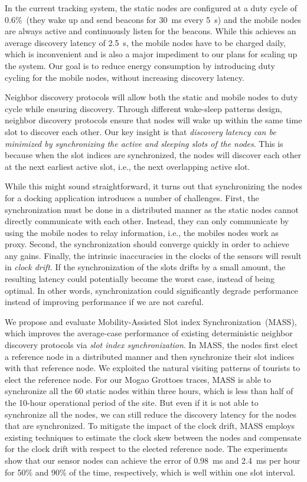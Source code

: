 \documentclass[twoside,twocolumn]{article}
\begin{document}
In the current tracking system, the static nodes are configured at a duty cycle of 0.6\%~(they wake up and send beacons
for 30~ms every 5~s) and the mobile nodes are always active and continuously listen for the beacons. While this achieves
an average discovery latency of 2.5~s, the mobile nodes have to be charged daily, which is inconvenient and is also a
major impediment to our plans for scaling up the system. Our goal is to reduce energy consumption by introducing duty
cycling for the mobile nodes, without increasing discovery latency.

Neighbor discovery protocols will allow both the static and mobile nodes to duty cycle while ensuring discovery. Through
different wake-sleep patterns design, neighbor discovery protocols ensure that nodes will wake up within the same time
slot to discover each other. Our key insight is that \emph{discovery latency can be minimized by synchronizing the active 
and sleeping slots of the nodes}. This is because when the slot indices are synchronized, the nodes will discover each 
other at the next earliest active slot, i.e., the next overlapping active slot.

While this might sound straightforward, it turns out that synchronizing the nodes for a docking application introduces
a number of challenges. First, the synchronization must be done in a distributed manner as the static nodes cannot 
directly communicate with each other. Instead, they can only communicate by using the mobile nodes to relay information,
 i.e., the mobiles nodes work as proxy. Second, the synchronization should converge quickly in order to achieve any gains. 
Finally, the intrinsic inaccuracies in the clocks of the sensors will result in \emph{clock drift}. If the synchronization 
of the slots drifts by a small amount, the resulting latency could potentially become the worst case, instead of being optimal. 
In other words, synchronization could significantly degrade performance instead of improving performance if we are not careful.

We propose and evaluate Mobility-Assisted Slot index Synchronization~(MASS), which improves the average-case performance
of existing deterministic neighbor discovery protocols via \emph{slot index synchronization}. In MASS, the nodes first
elect a reference node in a distributed manner and then synchronize their slot indices with that reference node. We
exploited the natural visiting patterns of tourists to elect the reference node. For our Mogao Grottoes traces, MASS is
able to synchronize all the 60 static nodes within three hours, which is less than half of the 10-hour operational period
of the site. But even if it is not able to synchronize all the nodes, we can still reduce the discovery latency for the
nodes that are synchronized. To mitigate the impact of the clock drift, MASS employs existing techniques to estimate the 
clock skew between the nodes and compensate for the clock drift with respect to the elected reference node. The experiments
show that our sensor nodes can achieve the error of 0.98~ms and 2.4~ms per hour for 50\% and 90\% of the time, respectively,
which is well within one slot interval.
\end{document}
